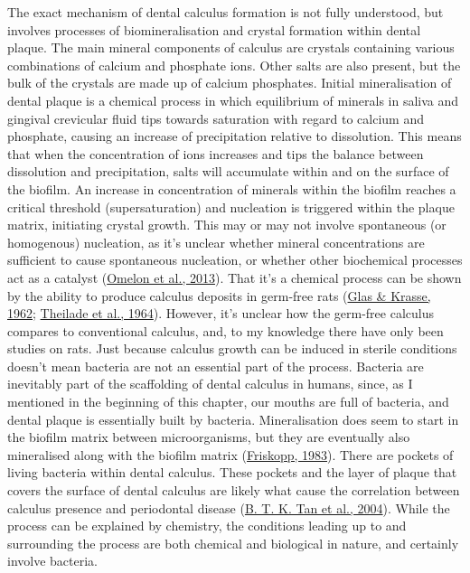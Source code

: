 \documentclass[
  b5paper,
]{book}
\begin{document}
The exact mechanism of dental calculus formation is not fully
understood, but involves processes of biomineralisation and crystal
formation within dental plaque. The main mineral components of calculus
are crystals containing various combinations of calcium and phosphate
ions. Other salts are also present, but the bulk of the crystals are
made up of calcium phosphates. Initial mineralisation of dental plaque
is a chemical process in which equilibrium of minerals in saliva and
gingival crevicular fluid tips towards saturation with regard to calcium
and phosphate, causing an increase of precipitation relative to
dissolution. This means that when the concentration of ions increases
and tips the balance between dissolution and precipitation, salts will
accumulate within and on the surface of the biofilm. An increase in
concentration of minerals within the biofilm reaches a critical
threshold (supersaturation) and nucleation is triggered within the
plaque matrix, initiating crystal growth. This may or may not involve
spontaneous (or homogenous) nucleation, as it's unclear whether mineral
concentrations are sufficient to cause spontaneous nucleation, or
whether other biochemical processes act as a catalyst
(\protect\hyperlink{ref-omelonReviewPhosphate2013}{Omelon et al.,
2013}). That it's a chemical process can be shown by the ability to
produce calculus deposits in germ-free rats
(\protect\hyperlink{ref-glasBiophysicalStudies1962}{Glas \& Krasse,
1962}; \protect\hyperlink{ref-theiladeGermfreeCalculus1964}{Theilade et
al., 1964}). However, it's unclear how the germ-free calculus compares
to conventional calculus, and, to my knowledge there have only been
studies on rats. Just because calculus growth can be induced in sterile
conditions doesn't mean bacteria are not an essential part of the
process. Bacteria are inevitably part of the scaffolding of dental
calculus in humans, since, as I mentioned in the beginning of this
chapter, our mouths are full of bacteria, and dental plaque is
essentially built by bacteria. Mineralisation does seem to start in the
biofilm matrix between microorganisms, but they are eventually also
mineralised along with the biofilm matrix
(\protect\hyperlink{ref-friskoppUltrastructureNondecalcified1983}{Friskopp,
1983}). There are pockets of living bacteria within dental calculus.
These pockets and the layer of plaque that covers the surface of dental
calculus are likely what cause the correlation between calculus presence
and periodontal disease
(\protect\hyperlink{ref-tanBacterialViability2004}{B. T. K. Tan et al.,
2004}). While the process can be explained by chemistry, the conditions
leading up to and surrounding the process are both chemical and
biological in nature, and certainly involve bacteria.
\end{document}
